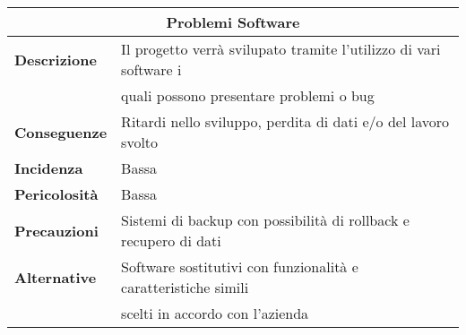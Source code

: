 \begin{center}
    \begin{tabularx}{0.8\linewidth}{l|l}
        \multicolumn{2}{c}{\textbf{Problemi Software}}                                                          \\
        \hline{\textbf{Descrizione}}    & Il progetto verrà svilupato tramite l'utilizzo di vari software i     \\ 
                                        & quali possono presentare problemi o bug                               \\
        \textbf{Conseguenze}            & Ritardi nello sviluppo, perdita di dati e/o del lavoro svolto         \\
        \textbf{Incidenza}              & Bassa                                                                 \\
        \textbf{Pericolosità}           & Bassa                                                                 \\
        \textbf{Precauzioni}            & Sistemi di backup con possibilità di rollback e recupero di dati      \\
        \textbf{Alternative}            & Software sostitutivi con funzionalità e caratteristiche simili        \\ 
                                        & scelti in accordo con l'azienda                                       \\     
    \end{tabularx}
\end{center}

